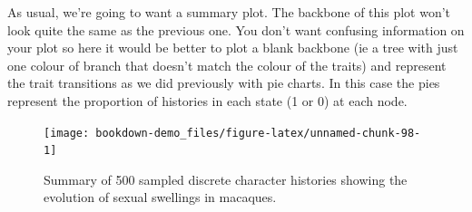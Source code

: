 \documentclass[
]{book}
\newenvironment{Shaded}{\begin{snugshade}}{\end{snugshade}}
\newcommand{\DataTypeTok}[1]{\textcolor[rgb]{0.13,0.29,0.53}{#1}}
\newcommand{\DecValTok}[1]{\textcolor[rgb]{0.00,0.00,0.81}{#1}}
\newcommand{\FloatTok}[1]{\textcolor[rgb]{0.00,0.00,0.81}{#1}}
\newcommand{\KeywordTok}[1]{\textcolor[rgb]{0.13,0.29,0.53}{\textbf{#1}}}
\newcommand{\NormalTok}[1]{#1}
\newcommand{\OperatorTok}[1]{\textcolor[rgb]{0.81,0.36,0.00}{\textbf{#1}}}
\newcommand{\StringTok}[1]{\textcolor[rgb]{0.31,0.60,0.02}{#1}}
\begin{document}
As usual, we're going to want a summary plot. The backbone of this plot won't look quite the same as the previous one. You don't want confusing information on your plot so here it would be better to plot a blank backbone (ie a tree with just one colour of branch that doesn't match the colour of the traits) and represent the trait transitions as we did previously with pie charts. In this case the pies represent the proportion of histories in each state (1 or 0) at each node.

\begin{Shaded}
\end{Shaded}

\begin{figure}[H]

{\centering \texttt{[image: bookdown-demo\_files/figure-latex/unnamed-chunk-98-1]} 

}

\caption{Summary of 500 sampled discrete character histories showing the evolution of sexual swellings in macaques.}\label{fig:unnamed-chunk-98}
\end{figure}
\end{document}

